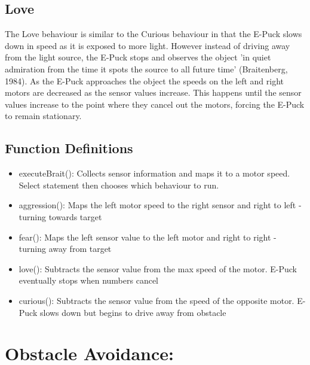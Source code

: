 \documentclass[11pt]{article}
\begin{document}
\subsection*{Love}

The Love behaviour is similar to the Curious behaviour in that the E-Puck slows down in speed as it is exposed to more light. However instead of driving away from the light source, the E-Puck stops and observes the object 'in quiet admiration from the time it spots the source to all future time' (Braitenberg, 1984). As the E-Puck approaches the object the speeds on the left and right motors are decreased as the sensor values increase. This happens until the sensor values increase to the point where they cancel out the motors, forcing the E-Puck to remain stationary.

\subsection*{Function Definitions}

\begin{itemize}
\item{executeBrait(): Collects sensor information and maps it to a motor speed. Select statement then chooses which behaviour to run.}
\item{aggression(): Maps the left motor speed to the right sensor and right to left - turning towards target}
\item{fear(): Maps the left sensor value to the left motor and right to right - turning away from target}
\item{love(): Subtracts the sensor value from the max speed of the motor. E-Puck eventually stops when numbers cancel}
\item{curious(): Subtracts the sensor value from the speed of the opposite motor. E-Puck slows down but begins to drive away from obstacle}
\end{itemize}

\section*{Obstacle Avoidance:}
\end{document}
